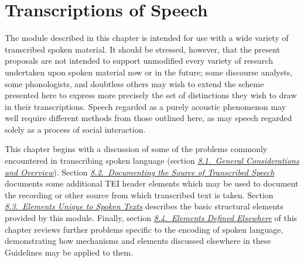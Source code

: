 
\section[{Transcriptions of Speech}]{Transcriptions of Speech}\label{TS}\par
The module described in this chapter is intended for use with a wide variety of transcribed spoken material. It should be stressed, however, that the present proposals are not intended to support unmodified every variety of research undertaken upon spoken material now or in the future; some discourse analysts, some phonologists, and doubtless others may wish to extend the scheme presented here to express more precisely the set of distinctions they wish to draw in their transcriptions. Speech regarded as a purely acoustic phenomenon may well require different methods from those outlined here, as may speech regarded solely as a process of social interaction. \par
This chapter begins with a discussion of some of the problems commonly encountered in transcribing spoken language (section \textit{\hyperref[TSOV]{8.1.\ General Considerations and Overview}}). Section \textit{\hyperref[HD32]{8.2.\ Documenting the Source of Transcribed Speech}} documents some additional TEI header elements which may be used to document the recording or other source from which transcribed text is taken. Section \textit{\hyperref[TSBA]{8.3.\ Elements Unique to Spoken Texts}} describes the basic structural elements provided by this module. Finally, section \textit{\hyperref[TSSA]{8.4.\ Elements Defined Elsewhere}} of this chapter reviews further problems specific to the encoding of spoken language, demonstrating how mechanisms and elements discussed elsewhere in these Guidelines may be applied to them.

